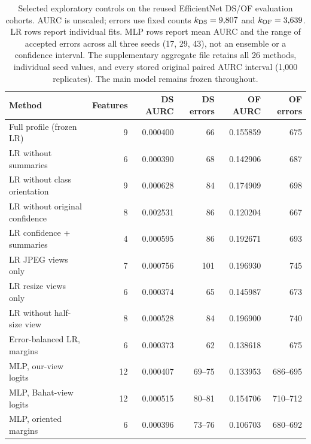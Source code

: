 \begin{table}[t]
\caption{Selected exploratory controls on the reused EfficientNet DS/OF evaluation cohorts. AURC is unscaled; errors use fixed counts $k_{\rm DS}=9{,}807$ and $k_{\rm OF}=3{,}639$. LR rows report individual fits. MLP rows report mean AURC and the range of accepted errors across all three seeds (17, 29, 43), not an ensemble or a confidence interval. The supplementary aggregate file retains all 26 methods, individual seed values, and every stored original paired AURC interval (1,000 replicates). The main model remains frozen throughout.}
\label{tab:extendedablation}
\centering\small
\begin{tabular}{lrrrrr}
\toprule
Method & Features & DS AURC & DS errors & OF AURC & OF errors \\
\midrule
Full profile (frozen LR) & 9 & 0.000400 & 66 & 0.155859 & 675 \\
LR without summaries & 6 & 0.000390 & 68 & 0.142906 & 687 \\
LR without class orientation & 9 & 0.000628 & 84 & 0.174909 & 698 \\
LR without original confidence & 8 & 0.002531 & 86 & 0.120204 & 667 \\
LR confidence + summaries & 4 & 0.000595 & 86 & 0.192671 & 693 \\
LR JPEG views only & 7 & 0.000756 & 101 & 0.196930 & 745 \\
LR resize views only & 6 & 0.000374 & 65 & 0.145987 & 673 \\
LR without half-size view & 8 & 0.000528 & 84 & 0.196900 & 740 \\
Error-balanced LR, margins & 6 & 0.000373 & 62 & 0.138618 & 675 \\
MLP, our-view logits & 12 & 0.000407 & 69--75 & 0.133953 & 686--695 \\
MLP, Bahat-view logits & 12 & 0.000515 & 80--81 & 0.154706 & 710--712 \\
MLP, oriented margins & 6 & 0.000396 & 73--76 & 0.106703 & 680--692 \\
\bottomrule
\end{tabular}
\end{table}

